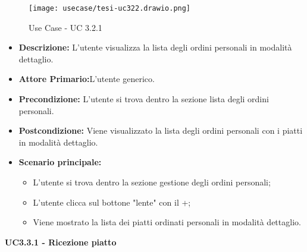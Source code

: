 \begin{figure}[H]
    \centering
    \texttt{[image: usecase/tesi-uc322.drawio.png]}
    \caption{Use Case - UC 3.2.1}
\end{figure}
\begin{itemize}
    \item \textbf{Descrizione:} L'utente visualizza la lista degli ordini personali in modalità dettaglio.
    \item \textbf{Attore Primario:}L'utente generico.
    \item \textbf{Precondizione:} L'utente si trova dentro la sezione lista degli ordini personali.
    \item \textbf{Postcondizione:} Viene visualizzato la lista degli ordini personali con i piatti in modalità dettaglio.
    \item \textbf{Scenario principale:}
    \begin{itemize}
        \item L'utente si trova dentro la sezione gestione degli ordini personali;
        \item L'utente clicca sul bottone "lente" con il +;
        \item Viene mostrato la lista dei piatti ordinati personali in modalità dettaglio.
    \end{itemize}
\end{itemize}
\textbf{UC3.3.1 - Ricezione piatto}
